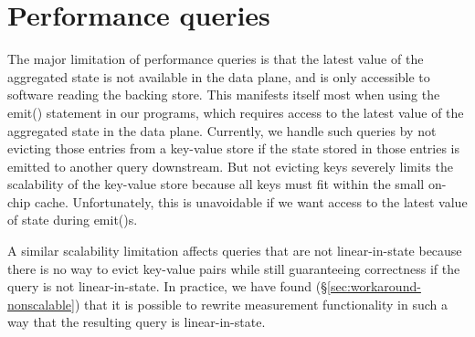 
\section{Performance queries}
\label{sec:pq_limitations}

The major limitation of performance queries is that the latest value of the
aggregated state is not available in the data plane, and is only accessible to
software reading the backing store. This manifests itself most when using the
{\ct emit()} statement in our programs, which requires access to the latest value of the
aggregated state in the data plane. Currently, we handle such queries by not
evicting those entries from a key-value store if the state stored in those
entries is emitted to another query downstream. But not evicting keys severely
limits the scalability of the key-value store because all keys must fit within
the small on-chip cache. Unfortunately, this is unavoidable if we want access to the latest
value of state during {\ct emit()}s.

A similar scalability limitation affects queries that are not linear-in-state
because there is no way to evict key-value pairs while still guaranteeing
correctness if the query is not linear-in-state. In practice, we have found
(\S\ref{sec:workaround-nonscalable}) that it is possible to rewrite measurement
functionality in such a way that the resulting query is linear-in-state.
